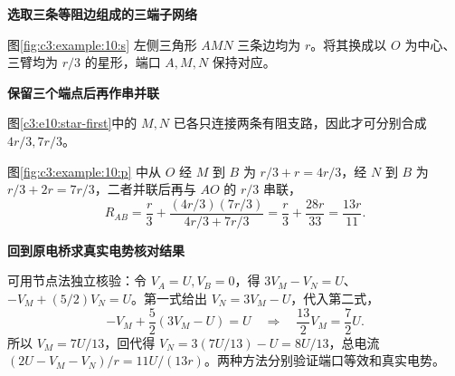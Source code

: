 \begin{solution}\textbf{选取三条等阻边组成的三端子网络}\par\nobreak
图\ref{fig:c3:example:10:s} 左侧三角形 $AMN$ 三条边均为 $r$。将其换成以 $O$ 为中心、三臂均为 $r/3$ 的星形，端口 $A,M,N$ 保持对应。


\par\medskip{}\noindent\textbf{保留三个端点后再作串并联}\par\nobreak
图\ref{c3:e10:star-first}中的 $M,N$ 已各只连接两条有阻支路，因此才可分别合成 $4r/3,7r/3$。


图\ref{fig:c3:example:10:p} 中从 $O$ 经 $M$ 到 $B$ 为 $r/3+r=4r/3$，经 $N$ 到 $B$ 为 $r/3+2r=7r/3$，二者并联后再与 $AO$ 的 $r/3$ 串联，
\[
 R_{AB}=\frac r3+
 \frac{(4r/3)(7r/3)}{4r/3+7r/3}
 =\frac r3+\frac{28r}{33}=\frac{13r}{11}.
\]


\par\medskip{}\noindent\textbf{回到原电桥求真实电势核对结果}\par\nobreak
可用节点法独立核验：令 $V_A=U,V_B=0$，得 $3V_M-V_N=U$、$-V_M+(5/2)V_N=U$。第一式给出 $V_N=3V_M-U$，代入第二式，
\[
 -V_M+\frac52(3V_M-U)=U
 \quad\Longrightarrow\quad\frac{13}{2}V_M=\frac72U.
\]
所以 $V_M=7U/13$，回代得 $V_N=3(7U/13)-U=8U/13$，总电流 $(2U-V_M-V_N)/r=11U/(13r)$。两种方法分别验证端口等效和真实电势。\end{solution}
